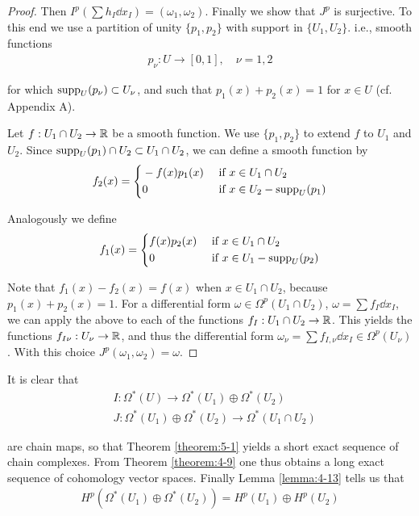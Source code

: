 \begin{proof}
  Then  $I^p(\sum h_I\dd x_I) = (\omega_1, \omega_2)$. Finally we show that $J^p$ is surjective. To this end we use 
  a partition of unity $\{p_1, p_2\}$ with support in $\{U_1, U_2\}$. i.e., smooth functions 
  \begin{align*}
    p_\nu: U\to [0, 1], \quad \nu = 1, 2
  \end{align*}

  for which $\mathrm{supp}_U(p_\nu)\subset U_\nu$, and such that $p_1(x) + p_2(x) = 1$ for $x\in U$ (cf.
  Appendix A).

  Let $f:U_1\cap U_2\to{\ensuremath{\mathbb{R}}}$ be a smooth function. We use $\{p_1, p_2\}$ to extend $f$ to $U_1$ and
  $U_2$. Since $\mathrm{supp}_U(p_1)\cap U_2\subset U_1\cap U_2$, we can define a smooth function by
  \begin{align*}
    f_2(x) = \left\{\begin{aligned}
      & -f(x)p_1(x) && \text{ if } x\in U_1\cap U_2 \\
      & 0 && \text{ if } x\in U_2 - \mathrm{supp}_U(p_1) 
    \end{aligned}\right.
  \end{align*}

  Analogously we define 
  \begin{align*}
    f_1(x) = \left\{\begin{aligned}
      & f(x)p_2(x) && \text{ if } x\in U_1\cap U_2 \\
      & 0 && \text{ if } x\in U_1 - \mathrm{supp}_U(p_2) 
    \end{aligned}\right.
  \end{align*}

  Note that $f_1(x) - f_2(x) = f(x)$ when $x\in U_1\cap U_2$, because $p_1(x) + p_2(x) = 1$.
  For a differential form $\omega\in \Omega^p(U_1\cap U_2)$, $\omega = \sum f_I\dd x_I$, we can apply 
  the above to each of the functions $f_I:U_1\cap U_2\to{\ensuremath{\mathbb{R}}}$. This yields the functions $f_{I\nu}:U_\nu\to{\ensuremath{\mathbb{R}}}$,
  and thus the differential form $\omega_\nu = \sum f_{I, \nu}\dd x_I\in\Omega^p(U_\nu)$. With this choice $J^p(\omega_1, \omega_2) 
  = \omega$. 
\end{proof}

It is clear that
\begin{align*}
  & I{:}\Omega^{*}(U)\to\Omega^{*}(U_{1})\oplus\Omega^{*}(U_{2})\\
  & J{:}\Omega^{*}(U_{1})\oplus\Omega^{*}(U_{2})\to\Omega^{*}(U_{1}\cap U_{2})
\end{align*}

are chain maps, so that Theorem \ref{theorem:5-1} yields a short exact sequence of chain
complexes. From Theorem \ref{theorem:4-9} one thus obtains a long exact sequence of
cohomology vector spaces. Finally Lemma \ref{lemma:4-13} tells us that
\begin{align*}
  H^p(\Omega^*(U_1)\oplus\Omega^*(U_2)) = H^p(U_1)\oplus H^p(U_2)
\end{align*}

